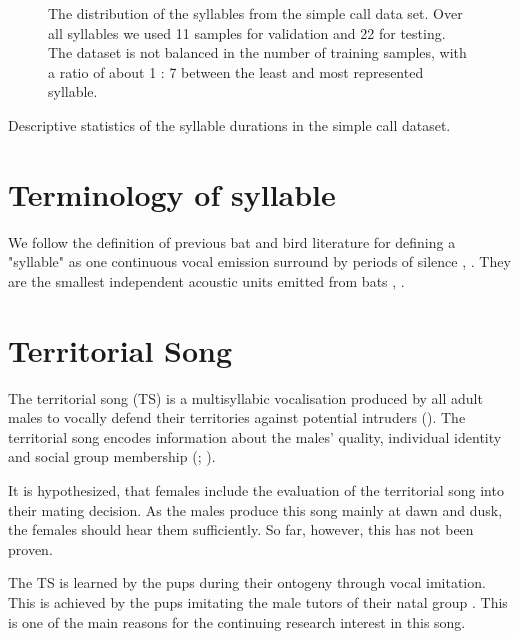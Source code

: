 \begin{figure}[ht!]
\centering
  \hfill
  \caption{The distribution of the syllables from the simple call data set. Over all syllables we used 11 samples for validation and 22 for testing. The dataset is not balanced in the number of training samples, with a ratio of about 1 : 7 between the least and most represented syllable.}
  \label{fig:dataset_sct_variable_length}
\end{figure}
\begin{table}[ht!]
\centering

\caption{Descriptive statistics of the syllable durations in the simple call dataset.}
\label{tab:syllable_duration_stats}
\end{table}

\section{Terminology of syllable}
We follow the definition of previous bat and bird literature for defining a "syllable" as one continuous vocal emission surround by periods of silence \cite{Kanwal1994}, \cite{Behr2004}. They are the smallest independent acoustic units emitted from bats \cite{Behr2004}, \cite{Lattenkamp2019TheContext}.

\section{Territorial Song}
The territorial song (TS) is a multisyllabic vocalisation produced by all adult males to vocally defend their territories against potential intruders (\cite{Behr2009}). The territorial song encodes information about the males' quality, individual identity and social group membership (\cite{Behr2006}; \cite{Eckenweber2013}).

It is hypothesized, that females include the evaluation of the territorial song into their mating decision. As the males produce this song mainly at dawn and dusk\cite{Eckenweber2013}, the females should hear them sufficiently. So far, however, this has not been proven.

The TS is learned by the pups during their ontogeny through vocal imitation. This is achieved by the pups imitating the male tutors of their natal group \cite{Knornschild2010}. This is one of the main reasons for the continuing research interest in this song.
